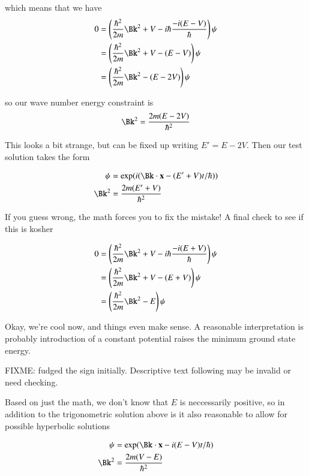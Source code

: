 \documentclass{article}
\begin{document}
which means that we have
\begin{align*}
0 &=
\left(\frac{\hbar^2}{2m}\Bk^2 + V -i\hbar \frac{-i(E - V)}{\hbar}\right)\psi \\
&= \left(\frac{\hbar^2}{2m}\Bk^2 + V -(E - V)\right)\psi \\
&= \left(\frac{\hbar^2}{2m}\Bk^2 - (E - 2V)\right)\psi \\
\end{align*}

so our wave number energy constraint is
\begin{align*}
\Bk^2 = \frac{2 m (E - 2V)}{\hbar^2}
\end{align*}

This looks a bit strange, but can be fixed up writing $E' = E - 2V$.  Then our test solution takes the form

\begin{align*}
\psi &= \exp(i(\Bk \cdot \Bx - (E' + V) t/\hbar)) \\
\Bk^2 &= \frac{2 m (E' + V)}{\hbar^2}
\end{align*}

If you guess wrong, the math forces you to fix the mistake!  A final check to see if this is kosher 

\begin{align*}
0 &=
\left(\frac{\hbar^2}{2m}\Bk^2 + V -i\hbar \frac{-i(E + V)}{\hbar}\right)\psi \\
&= \left(\frac{\hbar^2}{2m}\Bk^2 + V -(E + V)\right)\psi \\
&= \left(\frac{\hbar^2}{2m}\Bk^2 - E\right)\psi \\
\end{align*}

Okay, we're cool now, and things even make sense.  A reasonable interpretation is probably introduction of a constant potential raises the minimum ground state energy.

FIXME: fudged the sign initially.  Descriptive text following may be invalid or need checking.

Based on just the math, we don't know that $E$ is neccessarily positive, so in addition to the trigonometric solution above is it also reasonable to
allow for possible
hyperbolic solutions

\begin{align*}
\psi &= \exp(\Bk \cdot \Bx - i(E - V) t/\hbar) \\
\Bk^2 &= \frac{2 m (V - E)}{\hbar^2}
\end{align*}
\end{document}
